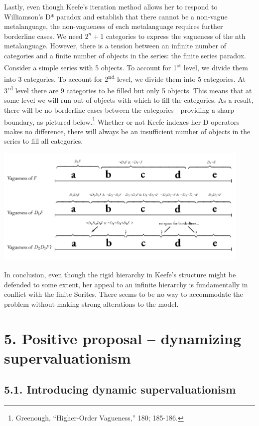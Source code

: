 Lastly, even though Keefe's iteration method allows her to respond to
Williamson's D* paradox and establish that there cannot be a non-vague
metalanguage, the non-vagueness of each metalanguage requires further
borderline cases. We need \(2^{n} + 1\) categories to express the
vagueness of the nth metalanguage. However, there is a tension between
an infinite number of categories and a finite number of objects in the
series: the finite series paradox. Consider a simple series with 5
objects. To account for 1\textsuperscript{st} level, we divide them into
3 categories. To account for 2\textsuperscript{nd} level, we divide them
into 5 categories. At 3\textsuperscript{rd} level there are 9 categories
to be filled but only 5 objects. This means that at some level we will
run out of objects with which to fill the categories. As a result, there
will be no borderline cases between the categories - providing a sharp
boundary, as pictured below.\footnote{Greenough, ``Higher-Order
  Vagueness,'' 180; 185-186.} Whether or not Keefe indexes her D
operators makes no difference, there will always be an insufficient
number of objects in the series to fill all categories.
\begin{center}
\includegraphics[width=0.925\textwidth]{papers/figures/2-2.pdf}
\end{center}
In conclusion, even though the rigid hierarchy in Keefe's structure
might be defended to some extent, her appeal to an infinite hierarchy is
fundamentally in conflict with the finite Sorites. There seems to be no
way to accommodate the problem without making strong alterations to the
model.

\section{5. Positive proposal -- dynamizing supervaluationism}

\subsection{5.1. Introducing dynamic supervaluationism}

